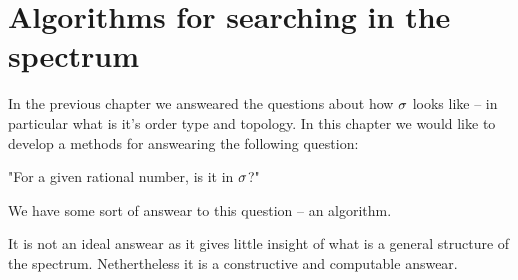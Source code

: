 \chapter{Algorithms for searching in the spectrum}

In the previous chapter we answeared the questions about how ${\sigma}$ looks like -- in particular 
what is it's order type and topology. In this chapter we would like to develop a 
methods for answearing the 
following question: 

"For a given rational number, is it in ${\sigma}$?" 

We have some sort of answear to this question -- an algorithm.

It is not an ideal answear as it gives little insight of what is a general structure 
of the spectrum. Nethertheless it is a constructive and computable answear. 











